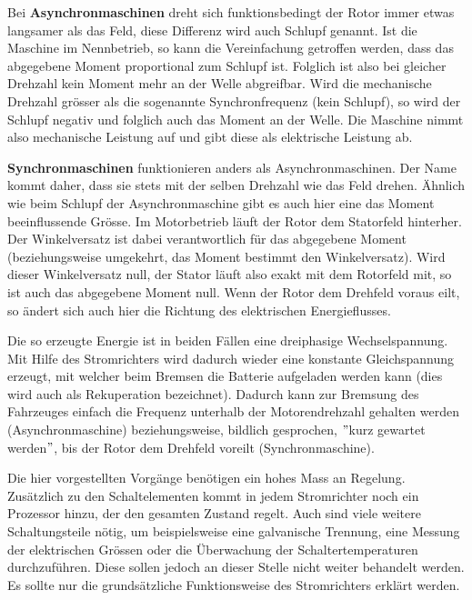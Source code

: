 Bei \textbf{Asynchronmaschinen} dreht sich funktionsbedingt der Rotor immer etwas langsamer als das Feld, diese Differenz wird auch Schlupf genannt. Ist die Maschine im Nennbetrieb, so kann die Vereinfachung getroffen werden, dass das abgegebene Moment proportional zum Schlupf ist. Folglich ist also bei gleicher Drehzahl kein Moment mehr an der Welle abgreifbar. Wird die mechanische Drehzahl grösser als die sogenannte Synchronfrequenz (kein Schlupf), so wird der Schlupf negativ und folglich auch das Moment an der Welle. Die Maschine nimmt also mechanische Leistung auf und gibt diese als elektrische Leistung ab.

\textbf{Synchronmaschinen} funktionieren anders als Asynchronmaschinen. Der Name kommt daher, dass sie stets mit der selben Drehzahl wie das Feld drehen. Ähnlich wie beim Schlupf der Asynchronmaschine gibt es auch hier eine das Moment beeinflussende Grösse. Im Motorbetrieb läuft der Rotor dem Statorfeld hinterher. Der Winkelversatz ist dabei verantwortlich für das abgegebene Moment (beziehungsweise umgekehrt, das Moment bestimmt den Winkelversatz). Wird dieser Winkelversatz null, der Stator läuft also exakt mit dem Rotorfeld mit, so ist auch das abgegebene Moment null. Wenn der Rotor dem Drehfeld voraus eilt, so ändert sich auch hier die Richtung des elektrischen Energieflusses.

Die so erzeugte Energie ist in beiden Fällen eine dreiphasige Wechselspannung. Mit Hilfe des Stromrichters wird dadurch wieder eine konstante Gleichspannung erzeugt, mit welcher beim Bremsen die Batterie aufgeladen werden kann (dies wird auch als Rekuperation bezeichnet). Dadurch kann zur Bremsung des Fahrzeuges einfach die Frequenz unterhalb der Motorendrehzahl gehalten werden (Asynchronmaschine) beziehungsweise, bildlich gesprochen, $"$kurz gewartet werden$"$, bis der Rotor dem Drehfeld voreilt (Synchronmaschine).

Die hier vorgestellten Vorgänge benötigen ein hohes Mass an Regelung. Zusätzlich zu den Schaltelementen kommt in jedem Stromrichter noch ein Prozessor hinzu, der den gesamten Zustand regelt. Auch sind viele weitere Schaltungsteile nötig, um beispielsweise eine galvanische Trennung, eine Messung der elektrischen Grössen oder die Überwachung der Schaltertemperaturen durchzuführen. Diese sollen jedoch an dieser Stelle nicht weiter behandelt werden. Es sollte nur die grundsätzliche Funktionsweise des Stromrichters erklärt werden.

